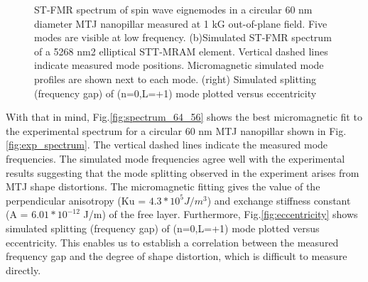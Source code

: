 \begin{figure}[h!]
\centering     
{}
\caption{ST-FMR spectrum of spin wave eignemodes in a circular 60 nm diameter MTJ nanopillar measured at 1 kG out-of-plane field. Five modes are visible at low frequency. (b)Simulated ST-FMR spectrum of a 5268 nm2 elliptical STT-MRAM element. Vertical dashed lines indicate measured mode positions. Micromagnetic simulated mode profiles are shown next to each mode.  (right) Simulated splitting (frequency gap) of (n=0,L=+1) mode plotted versus eccentricity}
\end{figure}


With that in mind, Fig.\ref{fig:spectrum_64_56} shows the best micromagnetic fit to the experimental spectrum for a circular 60 nm MTJ nanopillar shown in Fig.\ref{fig:exp_spectrum}. The vertical dashed lines indicate the measured mode frequencies. The simulated mode frequencies agree well with the experimental results suggesting that the mode splitting observed in the experiment arises from MTJ shape distortions. The micromagnetic fitting gives the value of the perpendicular anisotropy (Ku = $4.3*10^5 J/m^3 $) and exchange stiffness constant (A = $6.01*10^{-12}$ J/m) of the free layer.  Furthermore, Fig.\ref{fig:eccentricity} shows simulated splitting (frequency gap) of (n=0,L=+1) mode plotted versus eccentricity. This enables us to establish a correlation between the measured frequency gap and the degree of shape distortion, which is difficult to measure directly.






